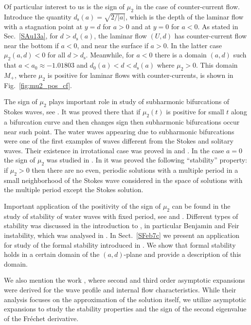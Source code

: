 \documentclass[oneside,a4paper,11pt]{article}
\theoremstyle{thmstyletwo}%
\theoremstyle{thmstylethree}%
\numberwithin{equation}{section}
\def\ds{d_{\textrm{s}}}
\begin{document}
Of particular interest to us is the sign of $\mu_2$ in the case of counter-current flow. Introduce the quantity $\ds(a)=\sqrt{2/|a|}$, which is the depth of the laminar flow with a stagnation point at $y=d$ for $a>0$ and at $y=0$ for $a<0$. As stated in Sec.~\ref{SAu13a}, for $d>\ds(a)$, the laminar flow $(U,d)$ has counter-current flow near the bottom if $a<0$, and near the surface if $a>0$. In the latter case $\mu_2(a,d)<0$ for all $d>\ds$. Meanwhile, for $a<0$ there is a domain $(a,d)$ such that $a<a_0\approx-1.01803$ and $d_0(a)<d<\ds(a)$ where $\mu_2>0$. This domain $M_+$, where $\mu_2$ is positive for laminar flows with  counter-currents, is shown in Fig.~\ref{fig:mu2_pos_cf}.

The sign of $\mu_2$ plays important role in study of subharmonic bifurcations of Stokes waves, see \cite{Koz1a}. It was proved there that if $\mu_2(t)$ is positive for small $t$ along a bifurcation curve and then changes sign then subharmonic bifurcations occur near such point. The water waves appearing due to subharmonic bifurcations were one of the first examples of waves different from the Stokes and solitary waves. Their existence in irrotational case was proved in \cite{BDT1} and \cite{BDT2}.
In the case $a=0$ the sign of $\mu_2$ was studied in \cite{Koz23}. In \cite{Koz26} it was proved the following ``stability'' property: if $\mu_2>0$ then there are no even, periodic solutions with a multiple period in a small neighborhood of the Stokes wave considered in the space of solutions with the multiple period except the Stokes solution.

Important application of the positivity of the  sign of $\mu_2$ can be found in the study of stability of water waves with fixed period, see \cite{CSst2} and \cite{DLZ}. Different types of stability was discussed in the introduction to \cite{CSst2}, in particular Benjamin and Feir instability, which was analysed in \cite{BMV23}. In Sect.~\ref{SFeb7c} we present an application for study of the formal stability introduced in \cite[Sect.~4]{CSst2}. We show that formal stability holds in a certain domain of the $(a,d)$-plane and provide a description of this domain.

We also mention the work \cite{CKSch15}, where second and third order asymptotic expansions were derived for the wave profile and internal flow characteristics. While their analysis focuses on the approximation of the solution itself, we utilize asymptotic expansions to study the stability properties and the sign of the second eigenvalue of the Fr\'{e}chet derivative.
\end{document}
